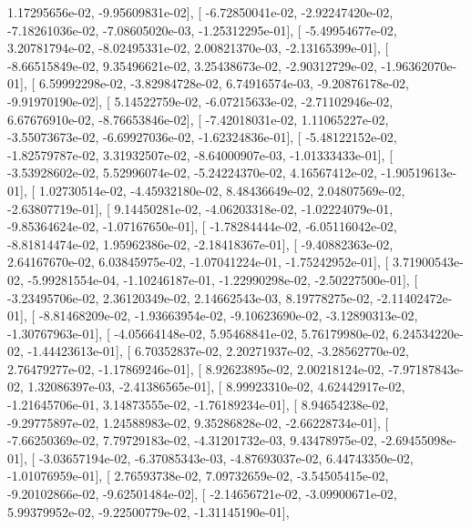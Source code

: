 \documentclass{article}
\begin{document}
          1.17295656e-02,  -9.95609831e-02],
       [ -6.72850041e-02,  -2.92247420e-02,  -7.18261036e-02,
         -7.08605020e-03,  -1.25312295e-01],
       [ -5.49954677e-02,   3.20781794e-02,  -8.02495331e-02,
          2.00821370e-03,  -2.13165399e-01],
       [ -8.66515849e-02,   9.35496621e-02,   3.25438673e-02,
         -2.90312729e-02,  -1.96362070e-01],
       [  6.59992298e-02,  -3.82984728e-02,   6.74916574e-03,
         -9.20876178e-02,  -9.91970190e-02],
       [  5.14522759e-02,  -6.07215633e-02,  -2.71102946e-02,
          6.67676910e-02,  -8.76653846e-02],
       [ -7.42018031e-02,   1.11065227e-02,  -3.55073673e-02,
         -6.69927036e-02,  -1.62324836e-01],
       [ -5.48122152e-02,  -1.82579787e-02,   3.31932507e-02,
         -8.64000907e-03,  -1.01333433e-01],
       [ -3.53928602e-02,   5.52996074e-02,  -5.24224370e-02,
          4.16567412e-02,  -1.90519613e-01],
       [  1.02730514e-02,  -4.45932180e-02,   8.48436649e-02,
          2.04807569e-02,  -2.63807719e-01],
       [  9.14450281e-02,  -4.06203318e-02,  -1.02224079e-01,
         -9.85364624e-02,  -1.07167650e-01],
       [ -1.78284444e-02,  -6.05116042e-02,  -8.81814474e-02,
          1.95962386e-02,  -2.18418367e-01],
       [ -9.40882363e-02,   2.64167670e-02,   6.03845975e-02,
         -1.07041224e-01,  -1.75242952e-01],
       [  3.71900543e-02,  -5.99281554e-04,  -1.10246187e-01,
         -1.22990298e-02,  -2.50227500e-01],
       [ -3.23495706e-02,   2.36120349e-02,   2.14662543e-03,
          8.19778275e-02,  -2.11402472e-01],
       [ -8.81468209e-02,  -1.93663954e-02,  -9.10623690e-02,
         -3.12890313e-02,  -1.30767963e-01],
       [ -4.05664148e-02,   5.95468841e-02,   5.76179980e-02,
          6.24534220e-02,  -1.44423613e-01],
       [  6.70352837e-02,   2.20271937e-02,  -3.28562770e-02,
          2.76479277e-02,  -1.17869246e-01],
       [  8.92623895e-02,   2.00218124e-02,  -7.97187843e-02,
          1.32086397e-03,  -2.41386565e-01],
       [  8.99923310e-02,   4.62442917e-02,  -1.21645706e-01,
          3.14873555e-02,  -1.76189234e-01],
       [  8.94654238e-02,  -9.29775897e-02,   1.24588983e-02,
          9.35286828e-02,  -2.66228734e-01],
       [ -7.66250369e-02,   7.79729183e-02,  -4.31201732e-03,
          9.43478975e-02,  -2.69455098e-01],
       [ -3.03657194e-02,  -6.37085343e-03,  -4.87693037e-02,
          6.44743350e-02,  -1.01076959e-01],
       [  2.76593738e-02,   7.09732659e-02,  -3.54505415e-02,
         -9.20102866e-02,  -9.62501484e-02],
       [ -2.14656721e-02,  -3.09900671e-02,   5.99379952e-02,
         -9.22500779e-02,  -1.31145190e-01],
\end{document}
